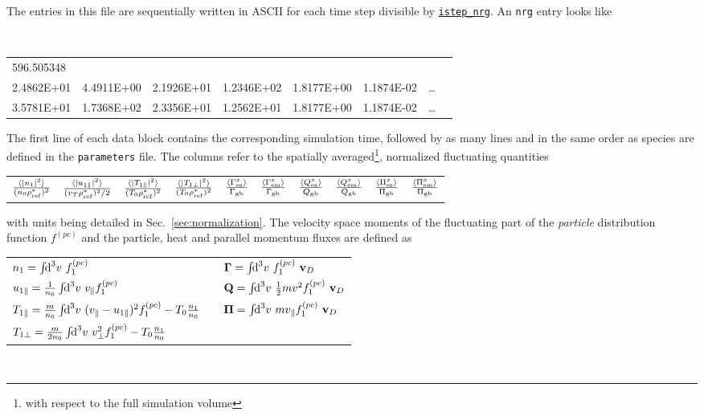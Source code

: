 \documentclass[12pt]{article}
\begin{document}
The entries in this file are sequentially written in ASCII for each time step divisible by
\hyperlink{istep_nrg}{\tt istep\_nrg}. An {\tt nrg} entry looks like
\begin{center}
\scriptsize \tt
\begin{tabular}{llllllll}
596.505348 & & & & & & &\\
2.4862E+01 & 4.4911E+00 & 2.1926E+01 & 1.2346E+02 & 1.8177E+00 & 1.1874E-02 & \ldots \\ %
3.5781E+01 & 1.7368E+02 & 2.3356E+01 & 1.2562E+01 & 1.8177E+00 & 1.1874E-02 & \ldots %
\end{tabular}
\end{center}
The first line of each data block contains the corresponding simulation time,
followed by as many lines and in the same order as species are defined in
the {\tt parameters} file. The columns refer to the spatially averaged\footnote{with respect to the full simulation
volume}, normalized fluctuating quantities\\[-5ex]
\begin{center}
\begin{tabular}{*{10}{c}} %
$\frac{\langle \left| n_1 \right|^2 \rangle}{(n_0\rho_{{\rm ref}}^*)^2}$ & $\frac{\langle |u_{1\parallel}|^2 \rangle}{(v_T \rho_{\rm ref}^*)^2/2}$ &
$\frac{{\langle |T_{1\parallel}|^2 \rangle}}{(T_0 \rho_{\rm ref}^*)^2}$ & $\frac{{\langle \left| T_{1\perp} \right|^2 \rangle}}{(T_0 \rho_{\rm ref}^*)^2}$ &
$\frac{\langle \Gamma_{\rm es}^x \rangle}{\Gamma_{\rm gb}}$ & $\frac{\langle \Gamma_{\rm em}^x \rangle}{\Gamma_{\rm gb}}$ &
$\frac{\langle Q_{\rm es}^x \rangle}{Q_{\rm gb}}$ & $\frac{\langle Q_{\rm em}^x \rangle}{Q_{\rm gb}}$ &
$\frac{\langle \Pi_{\rm es}^x \rangle}{\Pi_{\rm gb}}$ & $\frac{\langle \Pi_{\rm em}^x \rangle}{\Pi_{\rm gb}}$ \\
\end{tabular}
\end{center}
with units being detailed in Sec.~\ref{sec:normalization}.
The velocity space moments of the fluctuating part of the {\em particle} distribution function $f^{(pc)}$ and the
particle, heat and parallel momentum fluxes are defined as\\[1ex]
\begin{tabular}{lp{3em}l}
$n_{1} = \int\!\!\text{d}^3v\,\, f_1^{(pc)}$                     & & $\mathbf{\Gamma} = \int\!\!\text{d}^3v\,\, f_1^{(pc)}\,\, \mathbf{v}_D$ \\
$u_{1\|} = \frac{1}{n_0} \int\!\!\text{d}^3v\,\,v_\| f_1^{(pc)}$ & & $\mathbf{Q} = \int\!\!\text{d}^3v\,\, \frac{1}{2}m v^2 f_1^{(pc)}\,\, \mathbf{v}_D$ \\
$T_{1\|} = \frac{m}{n_{0}} \int\!\!\text{d}^3v\,\,(v_\|-u_{1\|})^2 f_1^{(pc)} - T_{0} \frac{n_{1}}{n_{0}}$ & &
$\mathbf{\Pi} = \int\!\!\text{d}^3v\,\, m v_{\|} f_1^{(pc)}\,\, \mathbf{v}_D$ \\
$T_{1\perp} = \frac{m}{2n_{0}} \int\!\!\text{d}^3v\,\,v_\perp^2 f_1^{(pc)} - T_{0} \frac{n_{1}}{n_0}$ & \\
\end{tabular}\\[1ex]
\end{document}
